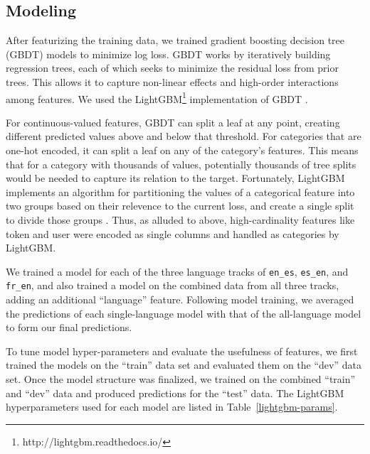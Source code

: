 \documentclass[11pt,a4paper]{article}
\begin{document}
\subsection{Modeling}

After featurizing the training data, we trained gradient boosting decision
tree (GBDT) models to minimize log loss. GBDT works by
iteratively building regression trees, each of which seeks to minimize the
residual loss from prior trees. This allows it to capture non-linear effects
and high-order interactions among features. We used the LightGBM\footnote{http://lightgbm.readthedocs.io/} implementation
of GBDT \cite{ke2017lightgbm}.

For continuous-valued features, GBDT can split a leaf at any point, creating
different predicted values above and below that threshold. For categories that
are one-hot encoded, it can split a leaf on any of the category's features. This
means that for a category with thousands of values, potentially thousands of
tree splits would be needed to capture its relation to the target. Fortunately,
LightGBM implements an algorithm for partitioning the values of a categorical
feature into two groups based on their relevence to the current loss, and create
a single split to divide those groups \cite{fisher1958grouping}. Thus, as
alluded to above, high-cardinality features like token and user were encoded as
single columns and handled as categories by LightGBM.

We trained a model for each of the three language tracks of {\tt en\_es}, {\tt es\_en},
and {\tt fr\_en}, and also trained a model on the combined data from
all three tracks, adding an additional ``language'' feature. Following model
training, we averaged the predictions of each single-language model with that of
the all-language model to form our final predictions.

To tune model hyper-parameters and evaluate the usefulness of features, we first
trained the models on the ``train'' data set and evaluated them on the ``dev''
data set. Once the model structure was finalized, we trained on the combined
``train'' and ``dev'' data and produced predictions for the ``test'' data. The
LightGBM hyperparameters used for each model are listed in Table~\ref{lightgbm-params}.
\end{document}

